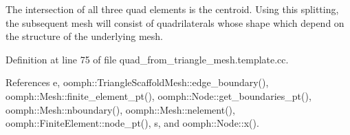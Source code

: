 The intersection of all three quad elements is the centroid. Using this splitting, the subsequent mesh will consist of quadrilaterals whose shape which depend on the structure of the underlying mesh. 

Definition at line 75 of file quad\+\_\+from\+\_\+triangle\+\_\+mesh.\+template.\+cc.



References e, oomph\+::\+Triangle\+Scaffold\+Mesh\+::edge\+\_\+boundary(), oomph\+::\+Mesh\+::finite\+\_\+element\+\_\+pt(), oomph\+::\+Node\+::get\+\_\+boundaries\+\_\+pt(), oomph\+::\+Mesh\+::nboundary(), oomph\+::\+Mesh\+::nelement(), oomph\+::\+Finite\+Element\+::node\+\_\+pt(), s, and oomph\+::\+Node\+::x().

\mbox{\label{classoomph_1_1QuadFromTriangleMesh_ae2036525cc3a3b2bdd8edfa01783a303}} 
